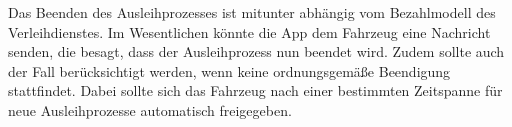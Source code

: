 Das Beenden des Ausleihprozesses ist mitunter abhängig vom Bezahlmodell des Verleihdienstes. Im Wesentlichen könnte die App dem Fahrzeug eine Nachricht senden, die besagt, dass der Ausleihprozess nun beendet wird. Zudem sollte auch der Fall berücksichtigt werden, wenn keine ordnungsgemäße Beendigung stattfindet. Dabei sollte sich das Fahrzeug nach einer bestimmten Zeitspanne für neue Ausleihprozesse automatisch freigegeben.